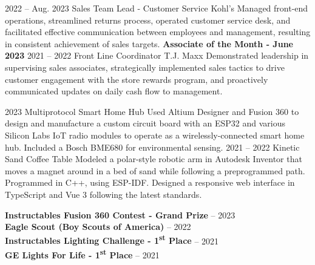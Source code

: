 \documentclass[9pt]{developercv} %
\begin{document}


\begin{entrylist}
	\entry
		{2022 -- Aug. 2023}
		{Sales Team Lead - Customer Service}
		{Kohl's}
		{Managed front-end operations, streamlined returns process, operated customer service desk, and facilitated effective communication between employees and management, resulting in consistent achievement of sales targets.  \textbf{Associate of the Month - June 2023} }
		\entry
		{2021 -- 2022}
		{Front Line Coordinator}
		{T.J. Maxx}
		{Demonstrated leadership in supervising sales associates, strategically implemented sales tactics to drive customer engagement with the store rewards program, and proactively communicated updates on daily cash flow to management.}
\end{entrylist}



\begin{entrylist}
	\entry
		{2023}
		{Multiprotocol Smart Home Hub}
		{}
		{Used Altium Designer and Fusion 360 to design and manufacture a custom circuit board with an ESP32 and various Silicon Labs IoT radio modules to operate as a wirelessly-connected smart home hub. Included a Bosch BME680 for environmental sensing.}
		\entry
		{2021 -- 2022}
		{Kinetic Sand Coffee Table}
		{}
		{Modeled a polar-style robotic arm in Autodesk Inventor that moves a magnet around in a bed of sand while following a preprogrammed path. Programmed in C++, using ESP-IDF. Designed a responsive web interface in TypeScript and Vue 3 following the latest standards.}
\end{entrylist}

\vspace{0.5cm}


\begin{minipage}[t]{1\textwidth}
	\vspace{-\baselineskip} %
	
	
	\textbf{Instructables Fusion 360 Contest - Grand Prize} -- 2023\\
	\textbf{Eagle Scout (Boy Scouts of America)} -- 2022\\
	\textbf{Instructables Lighting Challenge - 1\textsuperscript{st} Place} -- 2021\\
	\textbf{GE Lights For Life - 1\textsuperscript{st} Place} -- 2021\\
\end{minipage}

\vspace{\baselineskip}

\end{document}
